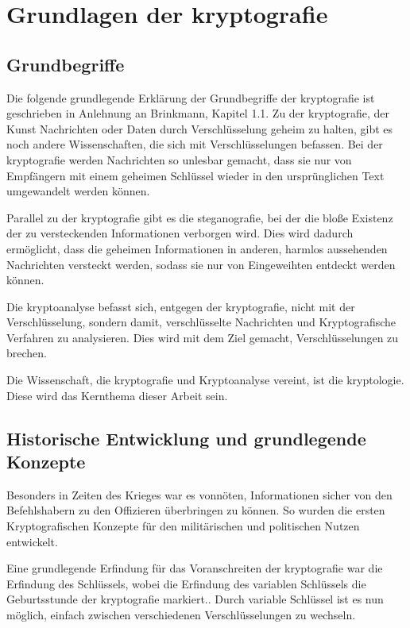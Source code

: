 \newpage


\section[Grundlagen der Kryptografie]{Grundlagen der \gls{kryptografie}}\label{sec:grundlagen-der-kryptografie}

\subsection{Grundbegriffe}\label{subsec:grundbegriffe}
Die folgende grundlegende Erklärung der Grundbegriffe der \gls{kryptografie} ist
geschrieben in Anlehnung an Brinkmann, Kapitel 1.1. Zu der \gls{kryptografie},
der Kunst Nachrichten oder Daten durch Verschlüsselung geheim zu halten, gibt es
noch andere Wissenschaften, die sich mit Verschlüsselungen befassen.
Bei der \gls{kryptografie} werden Nachrichten so unlesbar gemacht, dass sie nur von Empfängern
mit einem geheimen Schlüssel wieder in den ursprünglichen Text umgewandelt werden
können.

Parallel zu der \gls{kryptografie} gibt es die \gls{steganografie},
bei der die bloße Existenz der zu versteckenden Informationen verborgen wird.
Dies wird dadurch ermöglicht, dass die geheimen Informationen in anderen, harmlos aussehenden
Nachrichten versteckt werden, sodass sie nur von Eingeweihten entdeckt werden
können.

Die \gls{kryptoanalyse} befasst sich, entgegen der \gls{kryptografie},
nicht mit der Verschlüsselung, sondern damit, verschlüsselte Nachrichten und
Kryptografische Verfahren zu analysieren.
Dies wird mit dem Ziel gemacht, Verschlüsselungen zu brechen.

Die Wissenschaft, die \gls{kryptografie} und Kryptoanalyse vereint, ist die
\gls{kryptologie}.
Diese wird das Kernthema dieser Arbeit sein.\autocite[\pagef~5]{brinkmann_vak_2001}

\subsection{Historische Entwicklung und grundlegende Konzepte}\label{subsec:historische-entwicklung-und-grundlegende-konzepte}
Besonders in Zeiten des Krieges war es vonnöten, Informationen sicher von den Befehlshabern
zu den Offizieren überbringen zu können.
So wurden die ersten Kryptografischen Konzepte für den militärischen und politischen Nutzen entwickelt.\autocite[]{beutelspacher_kurze_2017}

Eine grundlegende Erfindung für das Voranschreiten der \gls{kryptografie} war die Erfindung des Schlüssels, wobei die Erfindung des variablen Schlüssels die Geburtsstunde der \gls{kryptografie} markiert.\autocite[]{beutelspacher_kurze_2017}.
Durch variable Schlüssel ist es nun möglich, einfach zwischen verschiedenen Verschlüsselungen zu wechseln.

